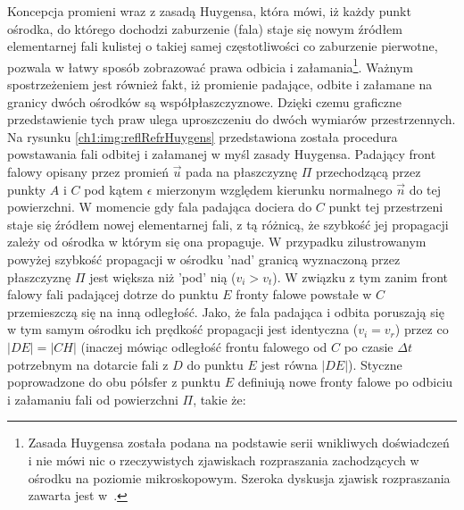 Koncepcja promieni wraz z zasadą Huygensa, która mówi, iż każdy punkt ośrodka, do którego dochodzi zaburzenie (fala) staje się nowym źródłem elementarnej fali kulistej o takiej samej częstotliwości co zaburzenie pierwotne, pozwala w łatwy sposób zobrazować prawa odbicia i załamania\footnote{Zasada Huygensa została podana na podstawie serii wnikliwych doświadczeń i nie mówi nic o rzeczywistych zjawiskach rozpraszania zachodzących w ośrodku na poziomie mikroskopowym. Szeroka dyskusja zjawisk rozpraszania zawarta jest w~\cite{Hecht}. }. Ważnym spostrzeżeniem jest również fakt, iż promienie padające, odbite i załamane na granicy dwóch ośrodków są współpłaszczyznowe. Dzięki czemu graficzne przedstawienie tych praw ulega uproszczeniu do dwóch wymiarów przestrzennych.
Na rysunku \ref{ch1:img:reflRefrHuygens} przedstawiona została procedura powstawania fali odbitej i załamanej w myśl zasady Huygensa. Padający front falowy opisany przez promień $\vec{u}$ pada na płaszczyznę $\Pi$ przechodzącą przez punkty $A$ i $C$ pod kątem $\epsilon$ mierzonym względem kierunku normalnego $\vec{n}$ do tej powierzchni. W momencie gdy fala padająca dociera do $C$ punkt tej przestrzeni staje się źródłem nowej elementarnej fali, z tą różnicą, że szybkość jej propagacji zależy od ośrodka w którym się ona propaguje. W przypadku zilustrowanym powyżej szybkość propagacji w ośrodku 'nad' granicą wyznaczoną przez płaszczyznę $\Pi$ jest większa niż 'pod' nią ($v_i > v_t$). W związku z tym zanim front falowy fali padającej dotrze do punktu $E$ fronty falowe powstałe w $C$ przemieszczą się na inną odległość. Jako, że fala padająca i odbita poruszają się w tym samym ośrodku ich prędkość propagacji jest identyczna ($v_i = v_r$) przez co $|DE| = |CH|$ (inaczej mówiąc odległość frontu falowego od $C$ po czasie $\Delta t$ potrzebnym na dotarcie fali z $D$ do punktu $E$ jest równa $|DE|$). Styczne poprowadzone do obu półsfer z punktu $E$ definiują nowe fronty falowe po odbiciu i załamaniu fali od powierzchni $\Pi$, takie że:
